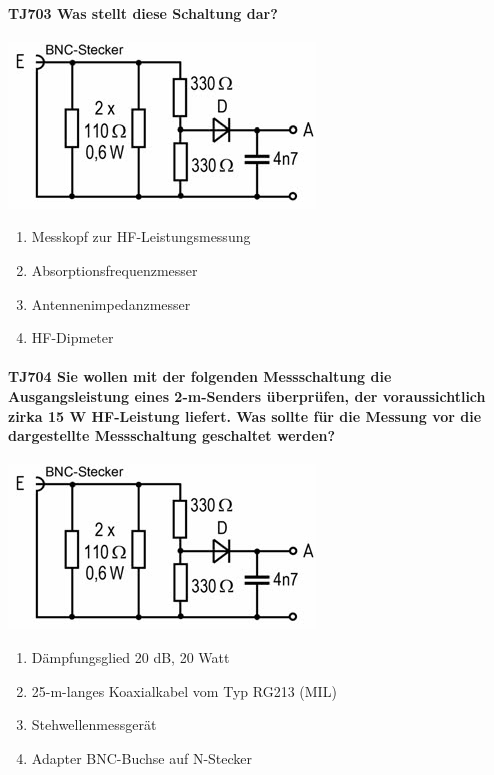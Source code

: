 \documentclass[8pt]{article}
\begin{document}
\paragraph*{TJ703 Was stellt diese Schaltung dar?}
\begin{center}
	\begin{minipage}{\linewidth}
		\centering
		\includegraphics[scale=1.0]{pics/tj703_a.jpg}
	\end{minipage}
\end{center}
\begin{enumerate}[nolistsep,label=\Alph*]
\item Messkopf zur HF-Leistungsmessung
\item Absorptionsfrequenzmesser
\item Antennenimpedanzmesser
\item HF-Dipmeter
\end{enumerate}

\paragraph*{TJ704 Sie wollen mit der folgenden Messschaltung die Ausgangsleistung eines 2-m-Senders überprüfen, der voraussichtlich zirka 15 W HF-Leistung liefert. Was sollte für die Messung vor die dargestellte Messschaltung geschaltet werden?}
\begin{center}
	\begin{minipage}{\linewidth}
		\centering
		\includegraphics[scale=1.0]{pics/tj704_a.jpg}
	\end{minipage}
\end{center}
\begin{enumerate}[nolistsep,label=\Alph*]
\item Dämpfungsglied 20 dB, 20 Watt
\item 25-m-langes Koaxialkabel vom Typ RG213 (MIL)
\item Stehwellenmessgerät
\item Adapter BNC-Buchse auf N-Stecker
\end{enumerate}
\end{document}
